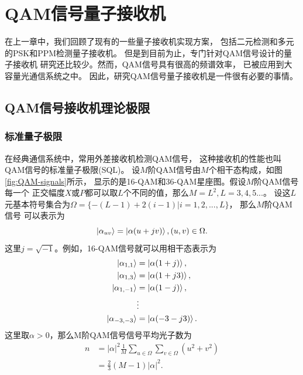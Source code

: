 \chapter{QAM信号量子接收机}
在上一章中，我们回顾了现有的一些量子接收机实现方案，
包括二元检测和多元的PSK和PPM检测量子接收机。
但是到目前为止，专门针对QAM信号设计的量子接收机
研究还比较少。然而，QAM信号具有很高的频谱效率，
已被应用到大容量光通信系统之中\cite{winzer2012high}。
因此，研究QAM信号量子接收机是一件很有必要的事情。

\section{QAM信号接收机理论极限}
\subsection{标准量子极限}
在经典通信系统中，常用外差接收机检测QAM信号，
这种接收机的性能也叫QAM信号的标准量子极限(SQL)\cite{kato1999quantum}。
设$M$阶QAM信号由$M$个相干态构成，如图\ref{fig:QAM-signals}所示，
显示的是16-QAM和36-QAM星座图。假设$M$阶QAM信号每一个
正交幅度$X$或$P$都可以取$L$个不同的值，那么$M=L^2, L=3,4,5...$。
设这$L$元基本符号集合为$\Omega = \{-(L-1) + 2(i-1) | i=1,2,...,L\}$，
那么$M$阶QAM信号
可以表示为
\begin{equation}
\ket{\alpha_{uv}} = \ket{\alpha(u + j v)}, (u, v) \in \Omega. 
\end{equation}
这里$j=\sqrt{-1}$。例如，16-QAM信号就可以用相干态表示为
\begin{equation}
\begin{split}
\ket{\alpha_{1,1}} &= \ket{\alpha(1 + j )}, \\
\ket{\alpha_{1,3}} &= \ket{\alpha(1 + j 3)}, \\
\ket{\alpha_{1,-1}} &= \ket{\alpha(1 - j )}, \\
                &\vdots                      \\
\ket{\alpha_{-3,-3}} &= \ket{\alpha(-3 - j 3)}.
\end{split}
\end{equation}
这里取$\alpha > 0$，那么M阶QAM信号信号平均光子数为
\begin{equation}
\begin{split}
n &= |\alpha|^2 \frac{1}{M}\sum_{u \in \Omega}\sum_{v \in \Omega} (u^2+v^2)\\
  &= \frac{2}{3}(M-1) |\alpha|^2.
\end{split}
\end{equation}


